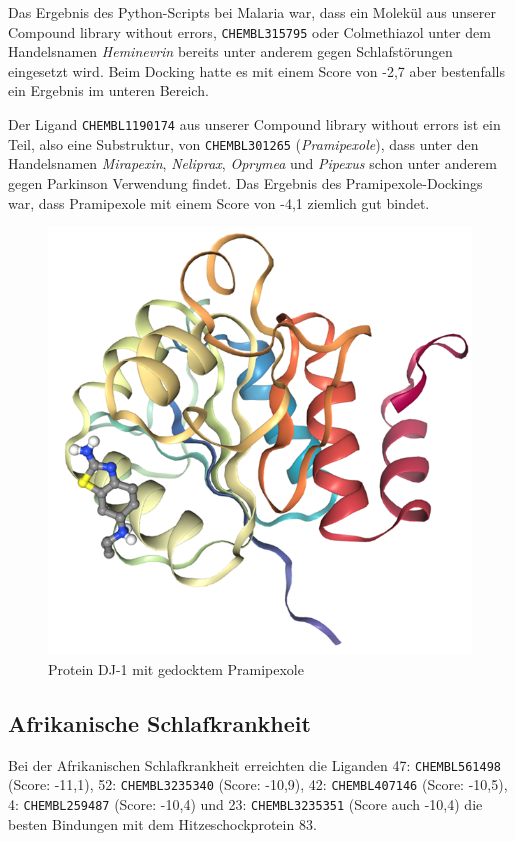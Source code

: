 \documentclass[10pt]{article}
\begin{document}
    Das Ergebnis des Python-Scripts bei Malaria war, dass ein Molekül aus unserer Compound library without errors,
    \texttt{CHEMBL315795} oder Colmethiazol unter dem Handelsnamen \emph{Heminevrin} bereits unter anderem gegen
    Schlafstörungen
    eingesetzt wird. Beim Docking hatte es mit einem Score von -2,7 aber bestenfalls ein Ergebnis im unteren Bereich.

    Der Ligand \texttt{CHEMBL1190174} aus unserer Compound library without errors ist ein Teil, also eine
    Substruktur, von
    \texttt{CHEMBL301265} (\emph{Pramipexole}), dass unter den Handelsnamen \emph{Mirapexin}, \emph{Neliprax},
    \emph{Oprymea} und \emph{Pipexus} schon
    unter anderem gegen Parkinson Verwendung findet.\cite{36} Das Ergebnis des Pramipexole-Dockings war, dass
    Pramipexole mit
    einem Score von -4,1 ziemlich gut bindet.

    \begin{figure}
        \centering
        \includegraphics[width=0.6\linewidth]{Protein DJ-1 mit gedocktem Pramipexole}
        \caption{Protein DJ-1 mit gedocktem Pramipexole}\label{fig:figure-pf-pramipexole}
    \end{figure}

    \subsection{Afrikanische Schlafkrankheit}\label{subsec:afrikanische-schlafkrankheit}
    Bei der Afrikanischen Schlafkrankheit erreichten die Liganden 47: \texttt{CHEMBL561498} (Score: -11,1),
    52: \texttt{CHEMBL3235340}
    (Score: -10,9), 42: \texttt{CHEMBL407146} (Score: -10,5), 4: \texttt{CHEMBL259487} (Score: -10,4) und
    23: \texttt{CHEMBL3235351} (Score auch
    -10,4) die besten Bindungen mit dem Hitzeschockprotein 83.
\end{document}
